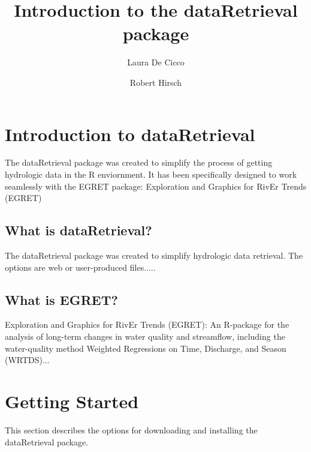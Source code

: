 \documentclass[a4paper,11pt]{article}
\begin{document}


\title{Introduction to the dataRetrieval package}
\author[1]{Laura De Cicco}
\author[1]{Robert Hirsch}



\maketitle
\tableofcontents

\section{Introduction to dataRetrieval}
The dataRetrieval package was created to simplify the process of getting hydrologic data in the R enviornment. It has been specifically designed to work seamlessly with the EGRET package: Exploration and Graphics for RivEr Trends (EGRET) 

\subsection{What is dataRetrieval?}
The dataRetrieval package was created to simplify hydrologic data retrieval.  The options are web or user-produced files.....

\subsection{What is EGRET?}
Exploration and Graphics for RivEr Trends (EGRET): An R-package for the analysis of long-term changes in water quality and streamflow, including the water-quality method Weighted Regressions on Time, Discharge, and Season (WRTDS)...

\newpage
\section{Getting Started}
This section describes the options for downloading and installing the dataRetrieval package.
\end{document}
